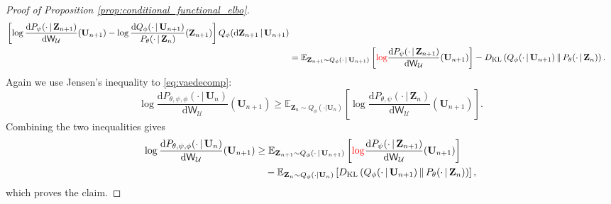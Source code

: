 \documentclass[11pt]{article}
\newcommand{\bbE}{\mathbb{E}}
\renewcommand{\d}{\mathrm{d}}
\newcommand{\jg}[1]{{\color{red}#1}}
\begin{document}
\begin{proof}[Proof of Proposition \ref{prop:conditional_functional_elbo}]
\begin{align*}
    \left[\log \frac{\d P_\psi(\cdot\,|\, \mathbf Z_{n+1})}{\d\mathsf{W}_\mathcal{U}}(\mathbf U_{n+1})-\log
    \frac{\d Q_\phi(\cdot\,|\, \mathbf U_{n+1})}{P_\theta(\cdot\,|\, \mathbf Z_n)}(\mathbf Z_{n+1})\right] Q_\phi(\d\mathbf Z_{n+1}\,|\, \mathbf U_{n+1})\\
    &=\bbE_{\mathbf{Z}_{n+1}\sim Q_\phi(\cdot\,|\,\mathbf{U}_{n+1})}\left[ \jg{\log} \frac{\d P_\psi(\cdot\,|\, \mathbf Z_{n+1})}{\d\mathsf{W}_\mathcal{U}}(\mathbf U_{n+1})\right]-D_\mathrm{KL}\left(Q_\phi(\cdot\,|\,\mathbf{U}_{n+1})\,\|\,P_\theta(\cdot\,|\,\mathbf{Z}_n)\right).
\end{align*}
Again we use Jensen's inequality to \eqref{eq:vaedecomp}:
\begin{equation*}
    \log \frac{\d P_{\theta,\psi,\phi}(\cdot\,|\,\mathbf{U}_n)}{\d\mathsf{W}_\mathcal{U}}(\mathbf{U}_{n+1})\geq\bbE_{\mathbf{Z}_n\sim Q_\phi(\cdot|\mathbf{U}_n)}\left[\log \frac{\d P_{\theta,\psi}(\cdot\,|\,\mathbf{Z}_n)}{\d\mathsf{W}_\mathcal{U}}(\mathbf{U}_{n+1})\right].
\end{equation*}
Combining the two inequalities gives
\begin{align*}
    \log \frac{\d P_{\theta,\psi,\phi}(\cdot\,|\,\mathbf{U}_n)}{\d\mathsf{W}_\mathcal{U}}(\mathbf{U}_{n+1})&\geq\bbE_{\mathbf{Z}_{n+1}\sim Q_\phi(\cdot\,|\,\mathbf{U}_{n+1})}\left[
    \jg{\log} \frac{\d P_\psi(\cdot\,|\, \mathbf Z_{n+1})}{\d\mathsf{W}_\mathcal{U}}(\mathbf U_{n+1})\right]\\
    &\quad -\bbE_{\mathbf{Z}_n\sim Q_\phi(\cdot|\mathbf{U}_n)}\left[D_\mathrm{KL}\left(Q_\phi(\cdot\,|\,\mathbf{U}_{n+1})\,\|\,P_\theta(\cdot\,|\,\mathbf{Z}_n)\right)\right],
\end{align*}
which proves the claim.
\end{proof}
\end{document}
